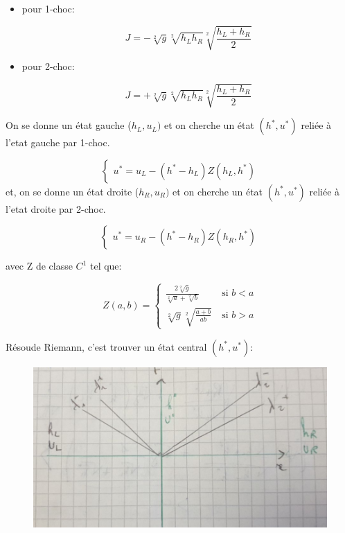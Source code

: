 \begin{itemize}
\item pour 1-choc:

$$J = - \sqrt[2]{g}\sqrt[2]{h_L h_R} \sqrt[2]{\frac{h_L + h_R}{2}}$$
\item pour 2-choc:

$$J = + \sqrt[2]{g}\sqrt[2]{h_L h_R} \sqrt[2]{\frac{h_L + h_R}{2}}$$
\end{itemize}

On se donne un \'etat gauche ($h_L,u_L)$ et on cherche un \'etat $(h^*,u^*)$
reli\'ee \`a l'etat gauche par 1-choc.

$$
\left \lbrace \begin{array}{rl}
u^* = u_L - (h^* -h_L) Z(h_L,h^*)
\end{array}\right.
$$
et, on se donne un \'etat droite ($h_R,u_R)$ et on cherche un \'etat $(h^*,u^*)$
reli\'ee \`a l'etat droite par 2-choc.

$$
\left \lbrace \begin{array}{rl}
u^* = u_R - (h^* -h_R) Z(h_R,h^*)
\end{array}\right.
$$

avec Z de classe $C^1$ tel que:

$$
Z(a,b)=
\left \lbrace \begin{array}{rl}
\frac{2\sqrt[2]{g}}{\sqrt[2]{a} + \sqrt[2]{b}} & ~\text{si }  b < a\\
\sqrt[2]{g} \sqrt[2]{\frac{{a+b}}{{ab}}}  & ~\text{si }  b > a
\end{array}\right.
$$

R\'esoude Riemann, c'est trouver un \'etat central $(h^*,u^*)$:

\begin{figure}[h!]
	\centering \includegraphics[scale=0.4]{Images_Fichiers/Y9.png}
\end{figure}

